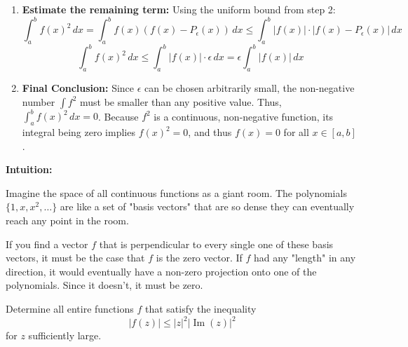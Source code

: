 \begin{solution}
\begin{enumerate}
    \item \textbf{Estimate the remaining term:} Using the uniform bound from step 2:
    \[ \int_a^b f(x)^2 \, dx = \int_a^b f(x)(f(x) - P_\epsilon(x)) \, dx \leq \int_a^b |f(x)| \cdot |f(x) - P_\epsilon(x)| \, dx \]
    \[ \int_a^b f(x)^2 \, dx \leq \int_a^b |f(x)| \cdot \epsilon \, dx = \epsilon \int_a^b |f(x)| \, dx \]

    \item \textbf{Final Conclusion:} Since $\epsilon$ can be chosen arbitrarily small, the non-negative number $\int f^2$ must be smaller than any positive value. Thus, $\int_a^b f(x)^2 \, dx = 0$. Because $f^2$ is a continuous, non-negative function, its integral being zero implies $f(x)^2 = 0$, and thus $f(x) = 0$ for all $x \in [a,b]$.
\end{enumerate}
\par\medskip
\textbf{Intuition:}
\par\medskip
Imagine the space of all continuous functions as a giant room. The polynomials $\{1, x, x^2, \dots\}$ are like a set of "basis vectors" that are so dense they can eventually reach any point in the room. 
\par\medskip
If you find a vector $f$ that is perpendicular to every single one of these basis vectors, it must be the case that $f$ is the zero vector. If $f$ had any "length" in any direction, it would eventually have a non-zero projection onto one of the polynomials. Since it doesn't, it must be zero.
\end{solution}

\begin{exercise}
\label{analysis:2015:3}
Determine all entire functions $f$ that satisfy the inequality
\[
|f(z)| \leq |z|^2|\operatorname{Im}(z)|^2
\]
for $z$ sufficiently large.
\end{exercise}

